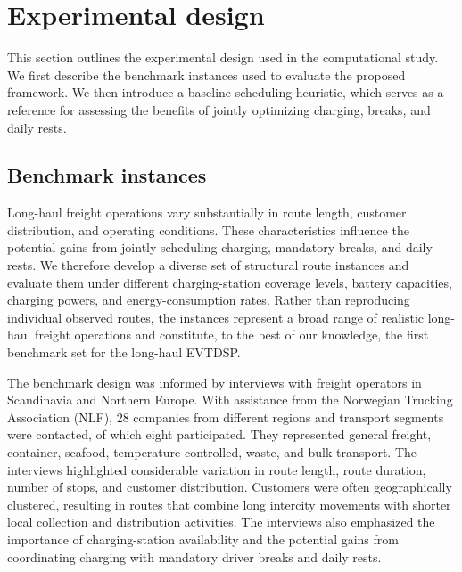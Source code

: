 \documentclass[3p,11pt,authoryear]{elsarticle}  %
\begin{document}




    
    
    \section{Experimental design} %
    


This section outlines the experimental design used in the computational study. We first describe the benchmark instances used to evaluate the proposed framework. We then introduce a baseline scheduling heuristic, which serves as a reference for assessing the benefits of jointly optimizing charging, breaks, and daily rests.

\subsection{Benchmark instances}


Long-haul freight operations vary substantially in route length, customer distribution, and operating conditions. These characteristics influence the potential gains from jointly scheduling charging, mandatory breaks, and daily rests. We therefore develop a diverse set of structural route instances and evaluate them under different charging-station coverage levels, battery capacities, charging powers, and energy-consumption rates. Rather than reproducing individual observed routes, the instances represent a broad range of realistic long-haul freight operations and constitute, to the best of our knowledge, the first benchmark set for the long-haul EVTDSP.

The benchmark design was informed by interviews with freight operators in Scandinavia and Northern Europe. With assistance from the Norwegian Trucking Association (NLF), 28 companies from different regions and transport segments were contacted, of which eight participated. They represented general freight, container, seafood, temperature-controlled, waste, and bulk transport. The interviews highlighted considerable variation in route length, route duration, number of stops, and customer distribution. Customers were often geographically clustered, resulting in routes that combine long intercity movements with shorter local collection and distribution activities. The interviews also emphasized the importance of charging-station availability and the potential gains from coordinating charging with mandatory driver breaks and daily rests.
\end{document}
